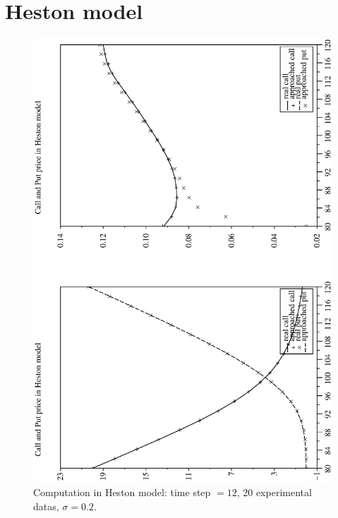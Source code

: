 \documentclass[a4paper]{article}
\begin{document}
\section{Heston model}
\begin{figure}[tbp]
\begin{center}
\includegraphics[width=12.5cm]{ArticlePS/hes2.eps}
\caption{Computation in Heston model: time step $=12$, 20
experimental datas, $\sigma=0.2$.\label{hes1}}
\end{center}
\end{figure}
\end{document}
